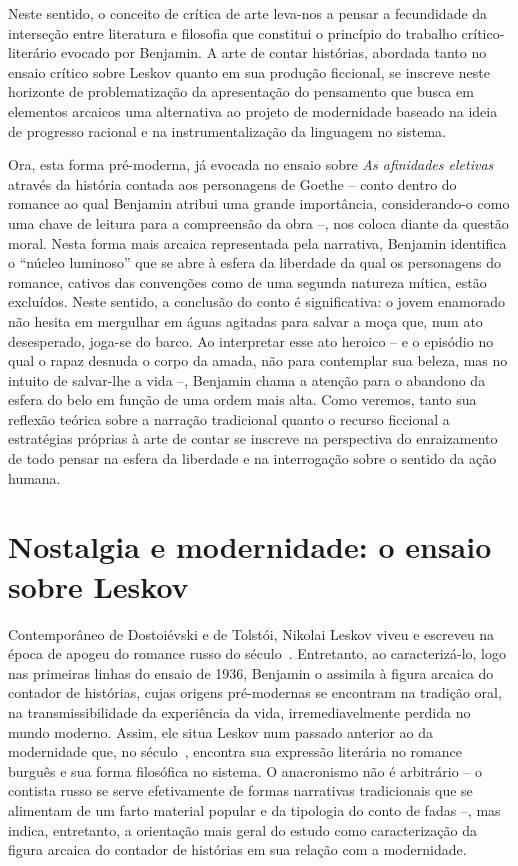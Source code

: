 Neste sentido, o conceito de crítica de arte leva-nos a pensar a
fecundidade da interseção entre literatura e filosofia que constitui o
princípio do trabalho crítico-literário evocado por Benjamin. A arte de
contar histórias, abordada tanto no ensaio crítico sobre Leskov quanto
em sua produção ficcional, se inscreve neste horizonte de
problematização da apresentação do pensamento que busca em elementos
arcaicos uma alternativa ao projeto de modernidade baseado na ideia de
progresso racional e na instrumentalização da linguagem no sistema.

Ora, esta forma pré-moderna, já evocada no ensaio sobre \emph{As
afinidades eletivas} através da história contada aos personagens de
Goethe -- conto dentro do romance ao qual Benjamin atribui uma grande
importância, considerando-o como uma chave de leitura para a compreensão
da obra --, nos coloca diante da questão moral. Nesta forma mais arcaica
representada pela narrativa, Benjamin identifica o ``núcleo luminoso''
que se abre à esfera da liberdade da qual os personagens do romance,
cativos das convenções como de uma segunda natureza mítica, estão
excluídos. Neste sentido, a conclusão do conto é significativa: o jovem
enamorado não hesita em mergulhar em águas agitadas para salvar a moça
que, num ato desesperado, joga-se do barco. Ao interpretar esse ato
heroico -- e o episódio no qual o rapaz desnuda o corpo da amada, não
para contemplar sua beleza, mas no intuito de salvar-lhe a vida --,
Benjamin chama a atenção para o abandono da esfera do belo em função de
uma ordem mais alta. Como veremos, tanto sua reflexão teórica sobre a
narração tradicional quanto o recurso ficcional a estratégias próprias à
arte de contar se inscreve na perspectiva do enraizamento de todo pensar
na esfera da liberdade e na interrogação sobre o sentido da ação humana.

\section{Nostalgia e modernidade: o ensaio sobre Leskov}

Contemporâneo de Dostoiévski e de Tolstói, Nikolai Leskov viveu e
escreveu na época de apogeu do romance russo do século~. Entretanto,
ao caracterizá-lo, logo nas primeiras linhas do ensaio de 1936, Benjamin
o assimila à figura arcaica do contador de histórias, cujas origens
pré-modernas se encontram na tradição oral, na transmissibilidade da
experiência da vida, irremediavelmente perdida no mundo moderno. Assim,
ele situa Leskov num passado anterior ao da modernidade que, no século~, 
encontra sua expressão literária no romance burguês e sua forma
filosófica no sistema. O anacronismo não é arbitrário -- o contista
russo se serve efetivamente de formas narrativas tradicionais que se
alimentam de um farto material popular e da tipologia do conto de fadas
--, mas indica, entretanto, a orientação mais geral do estudo como
caracterização da figura arcaica do contador de histórias em sua relação
com a modernidade.

